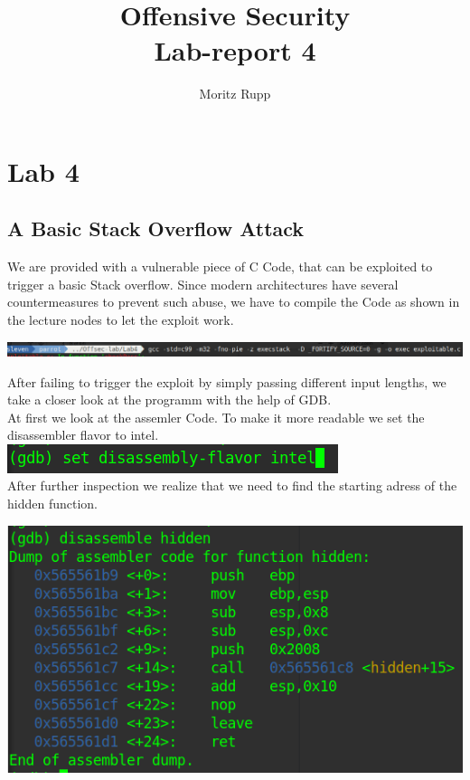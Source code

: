 \documentclass[a4paper,10pt]{article}
\title{Offensive Security\\Lab-report 4}
\author{Moritz Rupp}
\begin{document}
\maketitle
\tableofcontents

\newpage
\section{Lab 4}
\subsection{A Basic Stack Overflow Attack}
We are provided with a vulnerable piece of C Code, that can be exploited to trigger a basic Stack overflow. Since modern architectures have several countermeasures to prevent such abuse, we have to compile the Code as shown in the lecture nodes to let the exploit work.
\begin{center}
 \includegraphics[scale=0.3]{gcc.png}
\end{center} 
After failing to trigger the exploit by simply passing different input lengths, we take a closer look at the programm with the help of GDB.\\
At first we look at the assemler Code. To make it more readable we set the disassembler flavor to intel. \includegraphics[scale=0.4]{intelfalvor.png}\\
After further inspection we realize that we need to find the starting adress of the hidden function.
\begin{center}
 \includegraphics[scale=0.5]{hidden.png}
\end{center}
\end{document}
